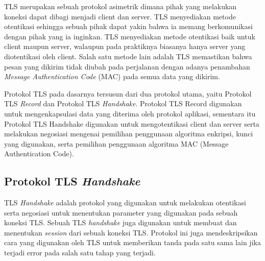   TLS merupakan sebuah protokol asimetrik dimana pihak yang melakukan koneksi dapat dibagi menjadi client dan server. TLS menyediakan metode otentikasi sehingga sebuah pihak dapat yakin bahwa ia memang berkomunikasi dengan pihak yang ia inginkan. TLS menyediakan metode otentikasi baik untuk client maupun server, walaupun pada praktiknya biasanya hanya server yang diotentikasi oleh client. Salah satu metode lain adalah TLS memastikan bahwa pesan yang dikirim tidak diubah pada perjalanan dengan adanya penambahan \textit{Message Authentication Code} (MAC) pada semua data yang dikirim.

  Protokol TLS pada dasarnya tersusun dari dua protokol utama, yaitu Protokol TLS \textit{Record} dan Protokol TLS \textit{Handshake}. Protokol TLS Record digunakan untuk mengenkapsulasi data yang diterima oleh protokol aplikasi, sementara itu Protokol TLS Handshake digunakan untuk mengotentikasi client dan server serta melakukan negosiasi mengenai pemilihan penggunaan algoritma enkripsi, kunci yang digunakan, serta pemilihan penggunaan algoritma MAC (Message Authentication Code).



  \subsection{Protokol TLS \textit{Handshake}}
    TLS \textit{Handshake} adalah protokol yang digunakan untuk melakukan otentikasi serta negosiasi untuk menentukan parameter yang digunakan pada sebuah koneksi TLS. Sebuah TLS \textit{handshake} juga digunakan untuk membuat dan menentukan \textit{session} dari sebuah koneksi TLS. Protokol ini juga mendeskripsikan cara yang digunakan oleh TLS untuk memberikan tanda pada satu sama lain jika terjadi error pada salah satu tahap yang terjadi.

